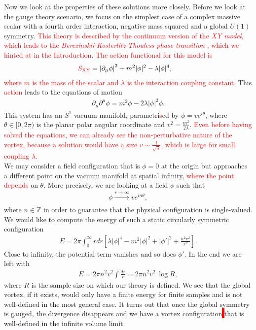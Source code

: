         Now we look at the properties of these solutions more closely. Before we look at the gauge theory scenario, we focus on the simplest case of a complex massive scalar with a fourth order interaction, negative mass squared and a global $U(1)$ symmetry. \textcolor{red}{This theory is described by the continuum version of the \textit{XY model}, which leads to the \textit{Berezinskii-Kosterlitz-Thouless phase transition} \cite{Kosterlitz_1973, Berezinsky:1970fr, Berezinsky:1972rfj}, which we hinted at in the Introduction}. \textcolor{red}{The action functional for this model is}
        \begin{align}
            \textcolor{red}{S_{\text{XY}}} &=  \left|\partial_{\mu} \phi \right|^2 + m^2 | \phi |^2 - \lambda |\phi|^4,
        \end{align}
\textcolor{red}{where $m$ is the mass of the scalar and $\lambda$ is the interaction coupling constant.}  This \textcolor{red}{action} leads to the equations of motion
    \begin{align}
        \partial_{\mu} \partial^{\mu} \phi = m^2 \phi - 2\lambda |\phi|^2 \phi.
    \end{align}
    This system has an $S^1$ vacuum manifold, parametri\textcolor{red}{s}ed by $\phi = v e^{i \theta}$, where $\theta \in [0,2\pi)$ is the planar polar angular coordinate and $v^2 = \frac{m^2}{2 \lambda}$. \textcolor{red}{Even before having solved the equations, we can already see the non-perturbative nature of the vortex, because a solution would have a size $v\sim \frac{1}{\sqrt{\lambda}}$, which is large for small coupling $\lambda$.}\\
    \indent We may consider a field configuration that is $\phi=0$ at the origin but approaches a different point on the vacuum manifold at spatial infinity\textcolor{red}{, where the point depends} on $\theta$. More precisely, we are looking at a field $\phi$ such that
    \begin{align}
        \phi \xrightarrow[]{r\rightarrow \infty} v e^{i n\theta},
    \end{align}
    where $n \in \mathbb{Z}$ in order to guarantee that the physical configuration is single-valued.
    We would like to compute the energy of such a static circularly symmetric configuration
    \begin{align}
        E= 2 \pi \int_0^{\infty} r dr \left[\lambda |\phi|^4 - m^2 |\phi|^2 + |\phi'|^2 + \frac{n^2 v^2}{r^2} \right].
    \end{align}
    Close to infinity, the potential term vanishes and so does $\phi'$. In the end we are left with
    \begin{align}
        E = 2\pi n^2 v^2 \int \frac{dr}{r} =  2\pi n^2 v^2  \ \log R,
    \end{align}
    where $R$ is the sample size on which our theory is defined. We see that the global vortex, if it exists, would only have a finite energy for finite samples and is not well-defined in the most general case. It turns out that once the global symmetry is gauged, the divergence disappears and we have a vortex configuration\colorbox{red}{ } that is well\textcolor{red}{-}defined in the infinite volume limit.
